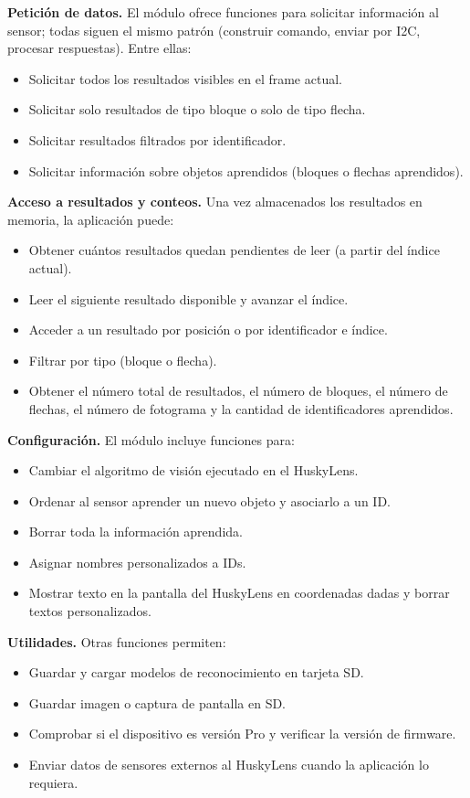 \documentclass{prgrado}
\begin{document}
\textbf{Petición de datos.} El módulo ofrece funciones para solicitar información al sensor; todas siguen el mismo patrón (construir comando, enviar por I2C, procesar respuestas). Entre ellas:
\begin{itemize}[noitemsep]
  \item Solicitar todos los resultados visibles en el frame actual.
  \item Solicitar solo resultados de tipo bloque o solo de tipo flecha.
  \item Solicitar resultados filtrados por identificador.
  \item Solicitar información sobre objetos aprendidos (bloques o flechas aprendidos).
\end{itemize}

\textbf{Acceso a resultados y conteos.} Una vez almacenados los resultados en memoria, la aplicación puede:
\begin{itemize}[noitemsep]
  \item Obtener cuántos resultados quedan pendientes de leer (a partir del índice actual).
  \item Leer el siguiente resultado disponible y avanzar el índice.
  \item Acceder a un resultado por posición o por identificador e índice.
  \item Filtrar por tipo (bloque o flecha).
  \item Obtener el número total de resultados, el número de bloques, el número de flechas, el número de fotograma y la cantidad de identificadores aprendidos.
\end{itemize}

\textbf{Configuración.} El módulo incluye funciones para:
\begin{itemize}[noitemsep]
  \item Cambiar el algoritmo de visión ejecutado en el HuskyLens.
  \item Ordenar al sensor aprender un nuevo objeto y asociarlo a un ID.
  \item Borrar toda la información aprendida.
  \item Asignar nombres personalizados a IDs.
  \item Mostrar texto en la pantalla del HuskyLens en coordenadas dadas y borrar textos personalizados.
\end{itemize}

\textbf{Utilidades.} Otras funciones permiten:
\begin{itemize}[noitemsep]
  \item Guardar y cargar modelos de reconocimiento en tarjeta SD.
  \item Guardar imagen o captura de pantalla en SD.
  \item Comprobar si el dispositivo es versión Pro y verificar la versión de firmware.
  \item Enviar datos de sensores externos al HuskyLens cuando la aplicación lo requiera.
\end{itemize}
\end{document}
